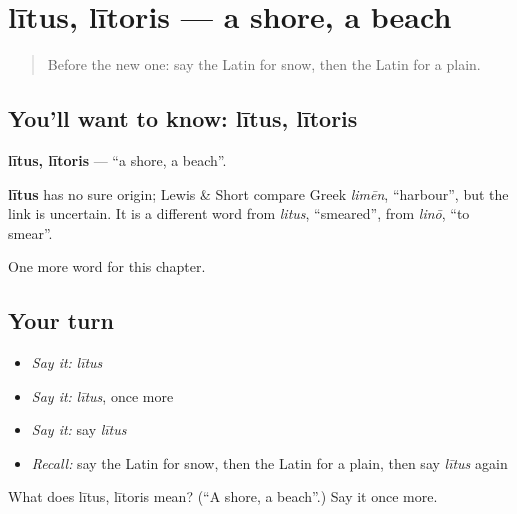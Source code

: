 \section[lītus, lītoris]{lītus, lītoris — a shore, a beach}

\label{lesson:LA-C89-litus}



\begin{quote}
Before the new one: say the Latin for snow, then the Latin for a plain.
\end{quote}

\subsection*{You'll want to know: lītus, lītoris}
\textbf{lītus, lītoris} — \textquotedblleft{}a shore, a beach\textquotedblright{}.

\begin{cousinweb}
\textbf{lītus} has no sure origin; Lewis \& Short compare Greek \emph{limēn}, \textquotedblleft{}harbour\textquotedblright{}, but the link is uncertain. It is a different word from \emph{litus}, \textquotedblleft{}smeared\textquotedblright{}, from \emph{linō}, \textquotedblleft{}to smear\textquotedblright{}.
\end{cousinweb}

\begin{grammarlens}[title={What you've built}]
One more word for this chapter.
\end{grammarlens}

\subsection*{Your turn}
\begin{itemize}
\raggedright
  \item \emph{Say it:} \emph{lītus}
  \item \emph{Say it:} \emph{lītus}, once more
  \item \emph{Say it:} say \emph{lītus}
  \item \emph{Recall:} say the Latin for snow, then the Latin for a plain, then say \emph{lītus} again
\end{itemize}

\begin{tcolorbox}[breakable,colback=teal!4,colframe=teal!35!black,title={Before you move on}]
What does lītus, lītoris mean? (\textquotedblleft{}A shore, a beach\textquotedblright{}.) Say it once more.
\end{tcolorbox}
